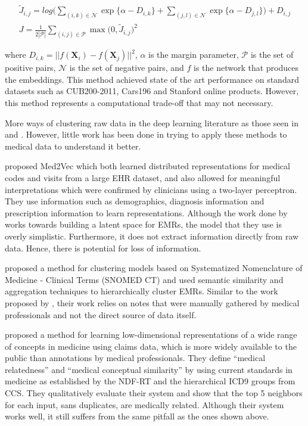 \begin{equation}
  \label{eq:lifted_structure_loss}
  \begin{gathered}
\tilde{J}_{i,j} = log \bigg( \sum_{(i,k) \in \mathcal{N}} \exp\{ \alpha - D_{i,k} \} + \sum_{(j,l) \in \mathcal{N}} \exp\{\alpha - D_{j, l}\} \bigg) + D_{i, j}
\\
J = \frac{1}{2 |\mathcal{P}|} \sum_{(i,j) \in \mathcal{P}} \max \Big( 0, \tilde{J}_{i,j}\Big)^2
  \end{gathered}
\end{equation}

\noindent
where $D_{i,k} = || f(\mathbf{X}_i) - f(\mathbf{X}_j)||^2$, $\alpha$ is the margin parameter, $\mathcal{P}$ is the set of positive pairs, $\mathcal{N}$ is the set of negative pairs, and $f$ is the network that produces the embeddings. This method achieved state of the art performance on standard datasets such as CUB200-2011, Cars196 and Stanford online products. However, this method represents a computational trade-off that may not necessary.

More ways of clustering raw data in the deep learning literature as those seen in \citet{jule, distknn, imgsimilarity} and \citet{errorprop}. However, little work has been done in trying to apply these methods to medical data to understand it better. 



\citet{mlprepresentation} proposed Med2Vec which both learned distributed representations for medical codes and visits from a large EHR dataset, and also allowed for meaningful interpretations which were confirmed by clinicians using a two-layer perceptron. They use information such as demographics, diagnosis information and prescription information to learn representations. Although the work done by \citet{mlprepresentation} works towards building a latent space for EMRs,  the model that they use is overly simplistic. Furthermore, it does not extract information directly from raw data. Hence, there is potential for loss of information.

\citet{goeg2015clustering} proposed a method for clustering models based on Systematized Nomenclature of Medicine - Clinical Terms (SNOMED CT) and used semantic similarity and aggregation techniques to hierarchically cluster EMRs. Similar to the work proposed by \citet{mlprepresentation}, their work relies on notes that were manually gathered by medical professionals and not the direct source of data itself. 

\citet{choi2016learning} proposed a method for learning low-dimensional representations of a wide range of concepts in medicine using claims data, which is more widely available to the public than annotations by medical professionals. They define  ``medical relatedness'' and  ``medical conceptual similarity'' by using current standards in medicine as established by the NDF-RT and the hierarchical ICD9 groups from CCS. They qualitatively evaluate their system and show that the top 5 neighbors for each input, sans duplicates, are medically related. Although their system works well, it still suffers from the same pitfall as the ones shown above. 

